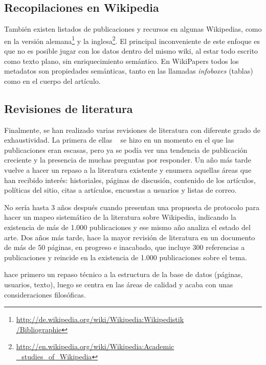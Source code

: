 \documentclass[11pt,onecolumn]{article}
\begin{document}
\subsection{Recopilaciones en Wikipedia}
También existen listados de publicaciones y recursos en algunas Wikipedias, como en la versión alemana\footnote{\href{http://de.wikipedia.org/wiki/Wikipedia:Wikipedistik/Bibliographie}{http://de.wikipedia.org/wiki/Wikipedia:Wikipedistik\\ /Bibliographie}} y la inglesa\footnote{\href{http://en.wikipedia.org/wiki/Wikipedia:Academic_studies_of_Wikipedia}{http://en.wikipedia.org/wiki/Wikipedia:Academic\\ \_studies\_of\_Wikipedia}}. El principal inconveniente de este enfoque es que no es posible jugar con los datos dentro del mismo wiki, al estar todo escrito como texto plano, sin enriquecimiento semántico. En WikiPapers todos los metadatos son propiedades semánticas, tanto en las llamadas \emph{infoboxes} (tablas) como en el cuerpo del artículo.

\subsection{Revisiones de literatura}
Finalmente, se han realizado varias revisiones de literatura con diferente grado de exhaustividad. La primera de ellas ~\citep{voss2005} se hizo en un momento en el que las publicaciones eran escasas, pero ya se podía ver una tendencia de publicación creciente y la presencia de muchas preguntas por responder. Un año más tarde ~\citep{ayers2006} vuelve a hacer un repaso a la literatura existente y enumera aquellas áreas que han recibido interés: historiales, páginas de discusión, contenido de los artículos, políticas del sitio, citas a artículos, encuestas a usuarios y listas de correo.

No sería hasta 3 años después cuando \cite{okoli2009b} presentan una propuesta de protocolo para hacer un mapeo sistemático de la literatura sobre Wikipedia, indicando la existencia de más de 1.000 publicaciones y ese mismo año \cite{okoli2009} analiza el estado del arte. Dos años más tarde, \cite{nielsen2011} hace la mayor revisión de literatura en un documento de más de 50 páginas, en progreso e inacabado, que incluye 300 referencias a publicaciones y reincide en la existencia de 1.000 publicaciones sobre el tema.

\cite{martin2011} hace primero un repaso técnico a la estructura de la base de datos (páginas, usuarios, texto), luego se centra en las áreas de calidad y acaba con unas consideraciones filosóficas.
\end{document}
